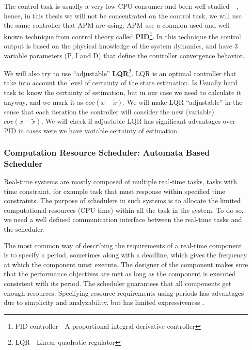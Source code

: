 \documentclass[11pt]{article}
\begin{document}
The control task is usually a very low CPU consumer and been well studied~\cite{Bennett}~\cite{Cervin}, hence, in this thesis we will not be concentrated on the control task, we will use the same controller that APM are using.
APM use a common used and well known technique from control theory called {\textbf{PID}\footnote{PID controller - A proportional-integral-derivative controller}}.
In this technique the control output is based on the physical knowledge of the system dynamics, and have 3 variable parameters (P, I and D) that define the controller convergence behavior.

We will also try to use ``adjustable'' {\textbf{LQR}\footnote{LQR - Linear-quadratic regulator}}.
LQR is an optimal controller that take into account the level of certainty of the state estimation. 
Is Usually hard task to know the certainty of estimation, but in our case we need to calculate it anyway, and we mark it as $cov(x-\tilde{x})$.
We will make LQR ``adjustable'' in the sense that each iteration the controller will consider the new (variable) $cov(x-\tilde{x})$.
We will check if adjustable LQR has significant advantages over PID in cases were we have variable certainty of estimation.

\subsubsection{Computation Resource Scheduler: Automata Based Scheduler}
\label{sec:scheduler}

Real-time systems are mostly composed of multiple real-time tasks, tasks with time constraint, for example task that must response within specified time constraints.
The purpose of schedulers in such systems is to allocate the limited computational resources (CPU time) within all the task in the system. To do so, we need a well defined communication interface between the real-time tasks and the scheduler.

The most common way of describing the requirements of a real-time component is to specify a period, sometimes along with a deadline, which gives the frequency at which the component must execute. The designer of the component makes sure that the performance objectives are met as long as the component is executed consistent with its period. The scheduler guarantees that all components get enough resources.
Specifying resource requirements using periods has advantages due to simplicity and analyzability, but has limited expressiveness \cite{RTComposer}. 
\end{document}
